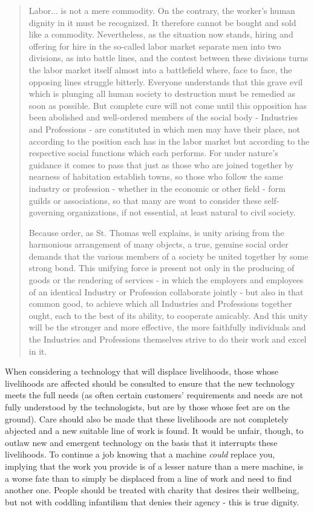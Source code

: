 \documentclass[letterpaper]{article}
\begin{document}
\begin{quote}
  Labor... is not a mere commodity. On the contrary, the worker's human dignity in it must be recognized. It therefore cannot be bought and sold like a commodity. Nevertheless, as the situation now stands, hiring and offering for hire in the so-called labor market separate men into two divisions, as into battle lines, and the contest between these divisions turns the labor market itself almost into a battlefield where, face to face, the opposing lines struggle bitterly. Everyone understands that this grave evil which is plunging all human society to destruction must be remedied as soon as possible. But complete cure will not come until this opposition has been abolished and well-ordered members of the social body - Industries and Professions - are constituted in which men may have their place, not according to the position each has in the labor market but according to the respective social functions which each performs. For under nature's guidance it comes to pass that just as those who are joined together by nearness of habitation establish towns, so those who follow the same industry or profession - whether in the economic or other field - form guilds or associations, so that many are wont to consider these self-governing organizations, if not essential, at least natural to civil society.

  Because order, as St. Thomas well explains, is unity arising from the harmonious arrangement of many objects, a true, genuine social order demands that the various members of a society be united together by some strong bond. This unifying force is present not only in the producing of goods or the rendering of services - in which the employers and employees of an identical Industry or Profession collaborate jointly - but also in that common good, to achieve which all Industries and Professions together ought, each to the best of its ability, to cooperate amicably. And this unity will be the stronger and more effective, the more faithfully individuals and the Industries and Professions themselves strive to do their work and excel in it. 
\end{quote}

When considering a technology that will displace livelihoods, those whose livelihoods are affected should be consulted to ensure that the new technology meets the full needs (as often certain customers' requirements and needs are not fully understood by the technologists, but are by those whose feet are on the ground). Care should also be made that these livelihoods are not completely abjected and a new suitable line of work is found. It would be unfair, though, to outlaw new and emergent technology on the basis that it interrupts these livelihoods. To continue a job knowing that a machine \textit{could} replace you, implying that the work you provide is of a lesser nature than a mere machine, is a worse fate than to simply be displaced from a line of work and need to find another one. People should be treated with charity that desires their wellbeing, but not with coddling infantilism that denies their agency - this is true dignity.
\end{document}
